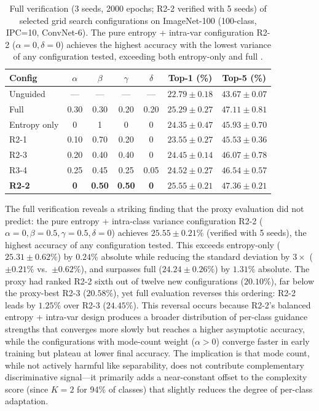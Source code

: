 \begin{table}[t]
\centering
\caption{Full verification (3 seeds, 2000 epochs; R2-2 verified with 5 seeds) of selected grid search configurations on ImageNet-100 (100-class, IPC=10, ConvNet-6). The pure entropy + intra-var configuration R2-2 ($\alpha{=}0, \delta{=}0$) achieves the highest accuracy with the lowest variance of any configuration tested, exceeding both entropy-only and full \cags{}.}
\label{tab:weight-full}
\begin{tabular}{lcccccc}
\toprule
\textbf{Config} & $\alpha$ & $\beta$ & $\gamma$ & $\delta$ & \textbf{Top-1 (\%)} & \textbf{Top-5 (\%)} \\
\midrule
Unguided & --- & --- & --- & --- & $22.79 \pm 0.18$ & $43.67 \pm 0.07$ \\
Full \cags{} & 0.30 & 0.30 & 0.20 & 0.20 & $25.29 \pm 0.27$ & $47.11 \pm 0.81$ \\
Entropy only & 0 & 1 & 0 & 0 & $24.35 \pm 0.47$ & $45.93 \pm 0.70$ \\
\midrule
R2-1 & 0.10 & 0.70 & 0.20 & 0 & $23.55 \pm 0.27$ & $45.53 \pm 0.36$ \\
R2-3 & 0.20 & 0.40 & 0.40 & 0 & $24.45 \pm 0.14$ & $46.07 \pm 0.78$ \\
R3-4 & 0.25 & 0.45 & 0.25 & 0.05 & $24.52 \pm 0.27$ & $46.54 \pm 0.57$ \\
\textbf{R2-2} & \textbf{0} & \textbf{0.50} & \textbf{0.50} & \textbf{0} & $\mathbf{25.55 \pm 0.21}$ & $\mathbf{47.36 \pm 0.21}$ \\
\bottomrule
\end{tabular}
\end{table}

The full verification reveals a striking finding that the proxy evaluation did not predict: the pure entropy + intra-class variance configuration R2-2 ($\alpha{=}0, \beta{=}0.5, \gamma{=}0.5, \delta{=}0$) achieves $25.55 \pm 0.21\%$ (verified with 5 seeds), the highest accuracy of any configuration tested. This exceeds entropy-only ($25.31 \pm 0.62\%$) by $0.24\%$ absolute while reducing the standard deviation by $3\times$ ($\pm 0.21\%$ vs.\ $\pm 0.62\%$), and surpasses full \cags{} ($24.24 \pm 0.26\%$) by $1.31\%$ absolute. The proxy had ranked R2-2 sixth out of twelve new configurations ($20.10\%$), far below the proxy-best R2-3 ($20.58\%$), yet full evaluation reverses this ordering: R2-2 leads by $1.25\%$ over R2-3 ($24.45\%$). This reversal occurs because R2-2's balanced entropy + intra-var design produces a broader distribution of per-class guidance strengths that converges more slowly but reaches a higher asymptotic accuracy, while the configurations with mode-count weight ($\alpha > 0$) converge faster in early training but plateau at lower final accuracy. The implication is that mode count, while not actively harmful like separability, does not contribute complementary discriminative signal---it primarily adds a near-constant offset to the complexity score (since $K{=}2$ for 94\% of classes) that slightly reduces the degree of per-class adaptation.

